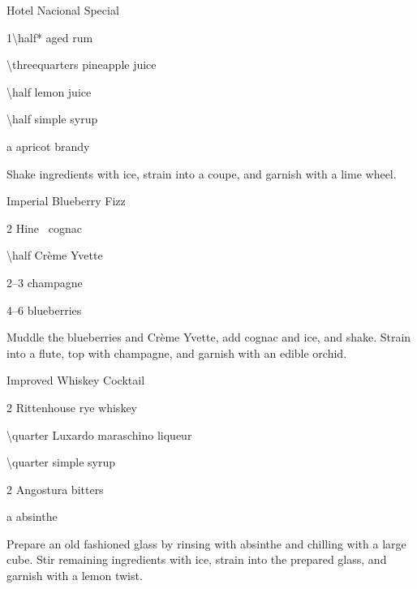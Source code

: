 \begin{Cocktail}[\PDT*]{Hotel Nacional Special}
  \begin{Ingredients}
  \item \SI{1\half*}{\oz} aged rum
  \item \SI{\threequarters}{\oz} pineapple juice
  \item \SI{\half}{\oz} lemon juice
  \item \SI{\half}{\oz} simple syrup
  \item a \si{\dash} apricot brandy
  \end{Ingredients}
  
  \begin{Instructions}
	Shake ingredients with ice, strain into a coupe, and garnish with a lime wheel.
  \end{Instructions}
\end{Cocktail}

\begin{Cocktail}[\PDT]{Imperial Blueberry Fizz}
  \begin{Ingredients}
  \item \SI{2}{\oz} Hine \vsop\ cognac
  \item \SI{\half}{\oz} Cr\`eme Yvette
  \item \SIrange{2}{3}{\oz} champagne
  \item \numrange{4}{6} blueberries
  \end{Ingredients}
  
  \begin{Instructions}
	Muddle the blueberries and Cr\`eme Yvette, add cognac and ice, and shake.  Strain into a flute, top with champagne, and garnish with an edible orchid.
  \end{Instructions}
\end{Cocktail}

\begin{Cocktail}[\PDT*]{Improved Whiskey Cocktail}
  \begin{Ingredients}
  \item \SI{2}{\oz} Rittenhouse rye whiskey
  \item \SI{\quarter}{\oz} Luxardo maraschino liqueur
  \item \SI{\quarter}{\oz} simple syrup
  \item 2 \si{\dashes} Angostura bitters
  \item a \si{\dash} absinthe
  \end{Ingredients}
  
  \begin{Instructions}
	Prepare an old fashioned glass by rinsing with absinthe and chilling with a large cube.  Stir remaining ingredients with ice, strain into the prepared glass, and garnish with a lemon twist.
  \end{Instructions}
\end{Cocktail}

